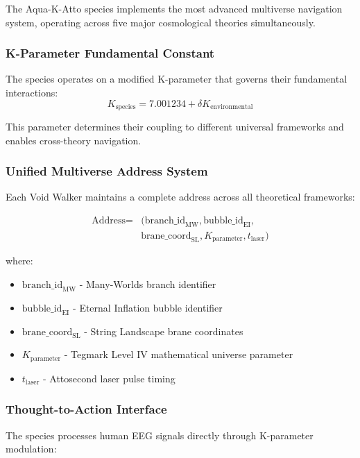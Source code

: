 \documentclass[11pt,a4paper]{article}
\begin{document}
The Aqua-K-Atto species implements the most advanced multiverse navigation system, operating across five major cosmological theories simultaneously.

\subsubsection{K-Parameter Fundamental Constant}
The species operates on a modified K-parameter that governs their fundamental interactions:
\begin{equation}
K_{\text{species}} = 7.001234 + \delta K_{\text{environmental}}
\end{equation}

This parameter determines their coupling to different universal frameworks and enables cross-theory navigation.

\subsubsection{Unified Multiverse Address System}
Each Void Walker maintains a complete address across all theoretical frameworks:

\begin{align}
\text{Address} = &(\text{branch\_id}_{\text{MW}}, \text{bubble\_id}_{\text{EI}}, \\
&\text{brane\_coord}_{\text{SL}}, K_{\text{parameter}}, t_{\text{laser}})
\end{align}

where:
\begin{itemize}
    \item $\text{branch\_id}_{\text{MW}}$ - Many-Worlds branch identifier
    \item $\text{bubble\_id}_{\text{EI}}$ - Eternal Inflation bubble identifier  
    \item $\text{brane\_coord}_{\text{SL}}$ - String Landscape brane coordinates
    \item $K_{\text{parameter}}$ - Tegmark Level IV mathematical universe parameter
    \item $t_{\text{laser}}$ - Attosecond laser pulse timing
\end{itemize}

\subsubsection{Thought-to-Action Interface}
The species processes human EEG signals directly through K-parameter modulation:
\end{document}
